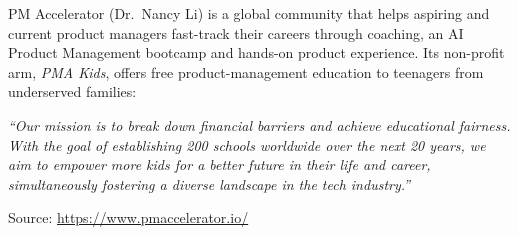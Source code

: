 \begin{tauenv}[frametitle=PM Accelerator — Mission]
PM Accelerator (Dr.\ Nancy Li) is a global community that helps aspiring and current product managers fast-track
their careers through coaching, an AI Product Management bootcamp and hands-on product experience. Its non-profit
arm, \emph{PMA Kids}, offers free product-management education to teenagers from underserved families:

\emph{``Our mission is to break down financial barriers and achieve educational fairness. With the goal of
establishing 200 schools worldwide over the next 20 years, we aim to empower more kids for a better future in their
life and career, simultaneously fostering a diverse landscape in the tech industry.''}

{\small Source: \url{https://www.pmaccelerator.io/}}
\end{tauenv}
